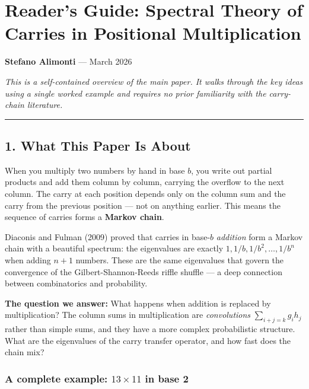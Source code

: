 \documentclass[
  11pt,
]{article}
\author{Stefano Alimonti --- stefalimonti@gmail.com}
\date{March 2026}
\begin{document}
{
\hypersetup{linkcolor=black}
\setcounter{tocdepth}{2}
\tableofcontents
}
\section{Reader's Guide: Spectral Theory of Carries in Positional
Multiplication}\label{readers-guide-spectral-theory-of-carries-in-positional-multiplication}

\textbf{Stefano Alimonti} --- March 2026

\emph{This is a self-contained overview of the main paper. It walks through the
key ideas using a single worked example and requires no prior familiarity with
the carry-chain literature.}

\begin{center}\rule{0.5\linewidth}{0.5pt}\end{center}

\newpage

\subsection{1. What This Paper Is About}\label{what-this-paper-is-about}

When you multiply two numbers by hand in base \(b\), you write out partial
products and add them column by column, carrying the overflow to the next
column. The carry at each position depends only on the column sum and the carry
from the previous position --- not on anything earlier. This means the sequence
of carries forms a \textbf{Markov chain}.

Diaconis and Fulman (2009) proved that carries in base-\(b\) \emph{addition}
form a Markov chain with a beautiful spectrum: the eigenvalues are exactly
\(1, 1/b, 1/b^2, \ldots, 1/b^n\) when adding \(n+1\) numbers. These are the same
eigenvalues that govern the convergence of the Gilbert-Shannon-Reeds riffle
shuffle --- a deep connection between combinatorics and probability.

\textbf{The question we answer:} What happens when addition is replaced by
multiplication? The column sums in multiplication are \emph{convolutions}
\(\sum_{i+j=k} g_i h_j\) rather than simple sums, and they have a more complex
probabilistic structure. What are the eigenvalues of the carry transfer
operator, and how fast does the chain mix?

\subsubsection{\texorpdfstring{A complete example: \(13 \times 11\) in base
2}{A complete example: 13 \textbackslash times 11 in base 2}}\label{a-complete-example-13-times-11-in-base-2}
\end{document}
